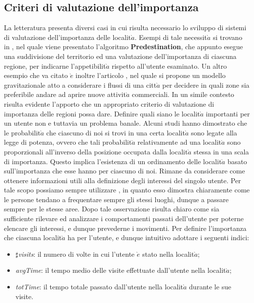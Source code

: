 \subsection{Criteri di valutazione dell'importanza}
La letteratura presenta diversi casi in cui risulta necessario lo sviluppo di sistemi
di valutazione dell'importanza delle localit$\grave{a}$.
Esempi di tale necessit$\grave{a}$ si trovano in \cite{cit_42}, nel quale viene presentato l'algoritmo
\textbf{Predestination}, che appunto esegue una suddivisione del territorio ed una
valutazione dell'importanza di ciascuna regione, per indicarne l'appetibilit$\grave{a}$
rispetto all'utente esaminato. Un altro esempio che va citato $\grave{e}$ inoltre l'articolo
\cite{cit_43}, nel quale si propone un modello gravitazionale atto a considerare i
flussi di una citt$\grave{a}$ per decidere in quali zone sia preferibile andare ad aprire
nuove attivit$\grave{a}$ commerciali. In un simile contesto risulta evidente l'apporto che
un appropriato criterio di valutazione di importanza delle regioni possa dare.
Definire quali siano le localit$\grave{a}$ importanti per un utente non e tuttavia un
problema banale. Alcuni studi \cite{cit_44} hanno dimostrato che le probabilit$\grave{a}$ che
ciascuno di noi si trovi in una certa localit$\grave{a}$ sono legate alla legge di potenza,
ovvero che tali probabilit$\grave{a}$ relativamente ad una localit$\grave{a}$ sono proporzionali
all'inverso della posizione occupata dalla localit$\grave{a}$ stessa in una scala di importanza.
Questo implica l'esistenza di un ordinamento delle localit$\grave{a}$ basato sull'importanza
che esse hanno per ciascuno di noi. Rimane da considerare come
ottenere informazioni utili alla definizione degli interessi del singolo utente. Per
tale scopo possiamo sempre utilizzare \cite{cit_44}, in quanto esso dimostra chiaramente
come le persone tendano a frequentare sempre gli stessi luoghi, dunque
a passare sempre per le stesse aree. Dopo tale osservazione risulta chiaro come
sia sufficiente rilevare ed analizzare i comportamenti passati dell'utente per
poterne elencare gli interessi, e dunque prevederne i movimenti.
Per definire l'importanza che ciascuna localit$\grave{a}$ ha per l'utente, e dunque
intuitivo adottare i seguenti indici:
\begin{itemize}
\item $\sharp$\textit{visits}: il numero di volte in cui l'utente $\grave{e}$ stato nella localit$\grave{a}$;
\item \textit{avgTime}: il tempo medio delle visite effettuate dall'utente nella localit$\grave{a}$;
\item \textit{totTime}: il tempo totale passato dall'utente nella localit$\grave{a}$ durante le sue visite.
\end{itemize}

